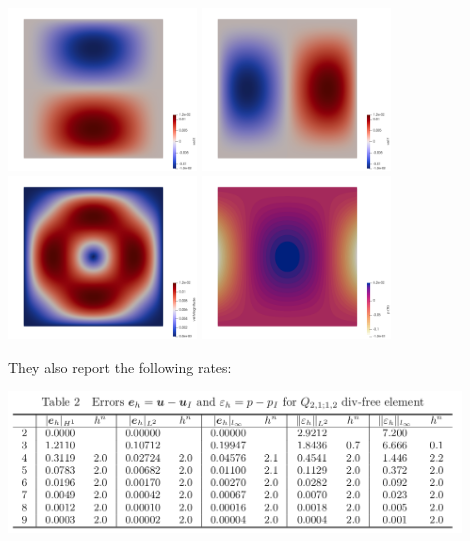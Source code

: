 \begin{center}
\includegraphics[width=5cm]{python_codes/fieldstone_161/results/bench2/th_u}
\includegraphics[width=5cm]{python_codes/fieldstone_161/results/bench2/th_v}\\
\includegraphics[width=5cm]{python_codes/fieldstone_161/results/bench2/th_vel}
\includegraphics[width=5cm]{python_codes/fieldstone_161/results/bench2/th_press}
\end{center}


They also report the following rates:

\begin{center}
\includegraphics[width=12cm]{python_codes/fieldstone_161/images/errors}
\end{center}

